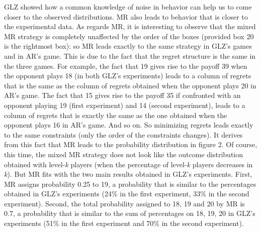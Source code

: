 \begin{Article}
\begin{refsection}[Umbhauer]
GLZ showed how a common knowledge of noise in behavior can help us to
come closer to the observed distributions. MR also leads to behavior
that is closer to the experimental data. As regards MR, it is
interesting to observe that the mixed MR strategy is completely
unaffected by the order of the boxes (provided box 20 is the rightmost
box): so MR leads exactly to the same strategy in GLZ's games and in
AR's game. This is due to the fact that the regret structure is the same
in the three games. For example, the fact that 19 gives rise to the
payoff 39 when the opponent plays 18 (in both GLZ's experiments) leads
to a column of regrets that is the same as the column of regrets
obtained when the opponent plays 20 in AR's game. The fact that 15 gives
rise to the payoff 35 if confronted with an opponent playing 19 (first
experiment) and 14 (second experiment), leads to a column of regrets
that is exactly the same as the one obtained when the opponent plays 16
in AR's game. And so on. So minimizing regrets leads exactly to the same
constraints (only the order of the constraints changes). It derives from
this fact that MR leads to the probability distribution in figure 2. Of
course, this time, the mixed MR strategy does not look like the outcome
distribution obtained with level-\emph{k} players (when the percentage
of level-\emph{k} players decreases in \emph{k}). But MR fits with the
two main results obtained in GLZ's experiments. First, MR assigns
probability 0.25 to 19, a probability that is similar to the percentages
obtained in GLZ's experiments (24\% in the first experiment, 33\% in the
second experiment). Second, the total probability assigned to 18, 19 and
20 by MR is 0.7, a probability that is similar to the sum of percentages
on 18, 19, 20 in GLZ's experiments (51\% in the first experiment and
70\% in the second experiment).


\end{refsection}
\end{Article}
